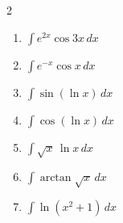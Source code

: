 \begin{enumerate}
\begin{multicols}{2}
\begin{enumerate}
\item $\displaystyle\int e^{2x}\cos 3x\,dx$
 
\item $\displaystyle\int e^{-x}\cos x\,dx$
 
\item $\displaystyle\int \sin(\ln x)\,dx$
 
\item $\displaystyle\int \cos(\ln x)\,dx$
 
\item $\displaystyle\int \sqrt{x}\,\ln x\,dx$
 
\item $\displaystyle\int \arctan\sqrt{x}\,dx$
 
\item $\displaystyle\int \ln(x^2+1)\,dx$
\end{enumerate}
\end{multicols}
\end{enumerate}
